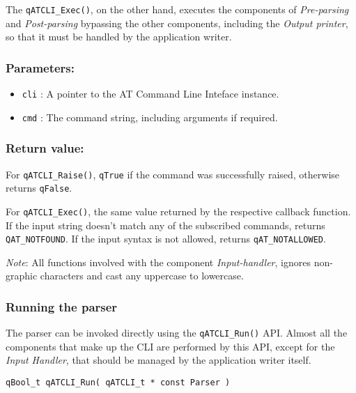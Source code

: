 The \lstinline{qATCLI_Exec()}, on the other hand, executes the components of \textit{Pre-parsing} and \textit{Post-parsing} bypassing the other components, including the \textit{Output printer}, so that it must be handled by the application writer.

\subsubsection*{Parameters:}
\begin{itemize}
    \item \lstinline{cli} : A pointer to the AT Command Line Inteface instance.
    \item \lstinline{cmd} : The command string, including arguments if required.
\end{itemize}

\subsubsection*{Return value:}
For \lstinline{qATCLI_Raise()}, \lstinline{qTrue} if the command was successfully raised, otherwise returns \lstinline{qFalse}.

For \lstinline{qATCLI_Exec()}, the same value returned by the respective callback function. If the input string doesn't match any of the subscribed commands, returns \lstinline{QAT_NOTFOUND}. If the input syntax is not allowed, returns \lstinline{qAT_NOTALLOWED}. 
\medskip

\begin{tcolorbox}
\ArrowBoldDownRight \textit{Note}: All functions involved with the component \textit{Input-handler},  ignores non-graphic characters and cast any uppercase to lowercase.
\end{tcolorbox}

\subsubsection{Running the parser} \label{runningparser}
The parser can be invoked directly using the \lstinline{qATCLI_Run()}  API. Almost all the components that make up the CLI are performed by this API, except for the \textit{Input Handler}, that should be managed by the application writer itself.
\medskip

\begin{lstlisting}[style=CStyle]
qBool_t qATCLI_Run( qATCLI_t * const Parser )
\end{lstlisting}

